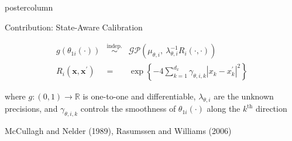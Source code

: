 \documentclass[final,10pt]{beamer}  %
\begin{document}
\begin{frame}{}
\begin{columns}[t]
\begin{column}{.33\textwidth}
\begin{beamercolorbox}[center,wd=1.325\textwidth]{postercolumn}
\begin{minipage}[T]{\textwidth}
{\begin{block}{Contribution: State-Aware Calibration}
{            {\small
            \begin{eqnarray*}  %
                g(\theta_{1i}(\cdot)) &\stackrel{\text{indep.}}{\sim}& \mathcal{GP}(\mu_{\theta,i}, ~\lambda_{\theta,i}^{-1}R_i(\cdot, \cdot))\\
                R_i(\mathbf{x}, \mathbf{x}^{\prime}) &=& \exp\left\{-4\sum_{k=1}^{d_x}\gamma_{\theta,i,k}|x_k - x_k^{\prime}|^2\right\}
            \end{eqnarray*}
            }

            where $g:(0,1) \rightarrow \mathbb{R}$ is one-to-one and differentiable, $\lambda_{\theta,i}$ are the unknown precisions, and $\gamma_{\theta,i,k}$ controls the smoothness of $\theta_{1i}(\cdot)$ along the $k^{\text{th}}$ direction
          }

          \hfill {\tiny McCullagh and Nelder (1989), Rasumssen and Williams (2006)}
        \end{block}
        \vfill




}
\end{minipage}
\end{beamercolorbox}
\end{column}
\end{columns}
\end{frame}
\end{document}
